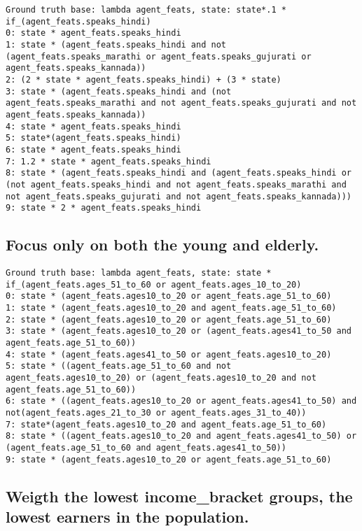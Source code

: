\begin{lstlisting}
Ground truth base: lambda agent_feats, state: state*.1 * if_(agent_feats.speaks_hindi)
0: state * agent_feats.speaks_hindi 
1: state * (agent_feats.speaks_hindi and not (agent_feats.speaks_marathi or agent_feats.speaks_gujurati or agent_feats.speaks_kannada)) 
2: (2 * state * agent_feats.speaks_hindi) + (3 * state) 
3: state * (agent_feats.speaks_hindi and (not agent_feats.speaks_marathi and not agent_feats.speaks_gujurati and not agent_feats.speaks_kannada)) 
4: state * agent_feats.speaks_hindi 
5: state*(agent_feats.speaks_hindi) 
6: state * agent_feats.speaks_hindi 
7: 1.2 * state * agent_feats.speaks_hindi 
8: state * (agent_feats.speaks_hindi and (agent_feats.speaks_hindi or (not agent_feats.speaks_hindi and not agent_feats.speaks_marathi and not agent_feats.speaks_gujurati and not agent_feats.speaks_kannada))) 
9: state * 2 * agent_feats.speaks_hindi 

\end{lstlisting}
\subsection{Focus only on both the young and elderly.}


\begin{lstlisting}
Ground truth base: lambda agent_feats, state: state * if_(agent_feats.ages_51_to_60 or agent_feats.ages_10_to_20)
0: state * (agent_feats.ages10_to_20 or agent_feats.age_51_to_60) 
1: state * (agent_feats.ages10_to_20 and agent_feats.age_51_to_60) 
2: state * (agent_feats.ages10_to_20 or agent_feats.age_51_to_60) 
3: state * (agent_feats.ages10_to_20 or (agent_feats.ages41_to_50 and agent_feats.age_51_to_60)) 
4: state * (agent_feats.ages41_to_50 or agent_feats.ages10_to_20) 
5: state * ((agent_feats.age_51_to_60 and not agent_feats.ages10_to_20) or (agent_feats.ages10_to_20 and not agent_feats.age_51_to_60)) 
6: state * ((agent_feats.ages10_to_20 or agent_feats.ages41_to_50) and not(agent_feats.ages_21_to_30 or agent_feats.ages_31_to_40)) 
7: state*(agent_feats.ages10_to_20 and agent_feats.age_51_to_60) 
8: state * ((agent_feats.ages10_to_20 and agent_feats.ages41_to_50) or (agent_feats.age_51_to_60 and agent_feats.ages41_to_50)) 
9: state * (agent_feats.ages10_to_20 or agent_feats.age_51_to_60) 

\end{lstlisting}
\subsection{Weigth the lowest income\_bracket groups, the lowest earners in the population.}


